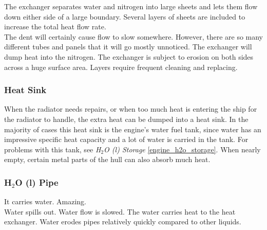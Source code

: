 \documentclass[a4paper]{article}
\begin{document}
The exchanger separates water and nitrogen into large sheets and lets them flow down either side of a large boundary. Several layers of sheets are included to increase the total heat flow rate.
\\ \pbhw
{}
{The dent will certainly cause flow to slow somewhere. However, there are so many different tubes and panels that it will go mostly unnoticed.}
{The exchanger will dump heat into the nitrogen.}
{The exchanger is subject to erosion on both sides across a huge surface area. Layers require frequent cleaning and replacing.}


\vspace{-0.5cm} \hspace{-18pt} \subsubsection{Heat Sink} \label{thermal_sink} \vspace{-0.2cm}
When the radiator needs repairs, or when too much heat is entering the ship for the radiator to handle, the extra heat can be dumped into a heat sink. In the majority of cases this heat sink is the engine's water fuel tank, since water has an impressive specific heat capacity and a lot of water is carried in the tank. For problems with this tank, see \textit{H$_2$O (l) Storage} \ref{engine_h2o_storage}. When nearly empty, certain metal parts of the hull can also absorb much heat. 

\vspace{-0.5cm} \hspace{-18pt} \subsubsection{H$_2$O (l) Pipe} \label{thermal_h2o_pipe} \vspace{-0.2cm}
It carries water. Amazing.
\\ \pbhw
{Water spills out.}
{Water flow is slowed.}
{The water carries heat to the heat exchanger.}
{Water erodes pipes relatively quickly compared to other liquids.}
\end{document}

